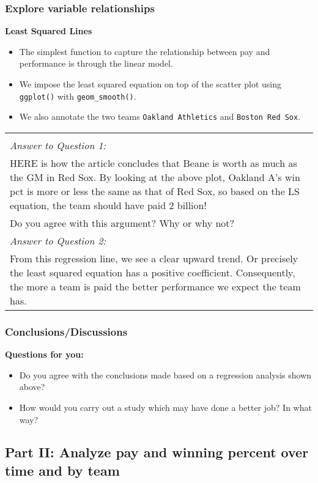 \documentclass[
]{article}
\providecommand{\tightlist}{%
  \setlength{\itemsep}{0pt}\setlength{\parskip}{0pt}}
\begin{document}
\frametitle{Explore variable relationships}

\textbf{Least Squared Lines}

\begin{itemize}
\tightlist
\item
  The simplest function to capture the relationship between pay and
  performance is through the linear model.\\
\item
  We impose the least squared equation on top of the scatter plot using
  \texttt{ggplot()} with \texttt{geom\_smooth()}.\\
\item
  We also annotate the two teams \texttt{Oakland\ Athletics} and
  \texttt{Boston\ Red\ Sox}.
\end{itemize}

\begin{longtable}[]{@{}
  >{\raggedright\arraybackslash}p{}@{}}
\toprule
\endhead
 \\
\emph{Answer to Question 1:} \\
HERE is how the article concludes that Beane is worth as much as the GM
in Red Sox. By looking at the above plot, Oakland A's win pct is more or
less the same as that of Red Sox, so based on the LS equation, the team
should have paid 2 billion! \\
Do you agree with this argument? Why or why not? \\
\emph{Answer to Question 2:} \\
From this regression line, we see a clear upward trend. Or precisely the
least squared equation has a positive coefficient. Consequently, the
more a team is paid the better performance we expect the team has. \\
\bottomrule
\end{longtable}

\frametitle{Conclusions/Discussions}

\textbf{Questions for you:}

\begin{itemize}
\tightlist
\item
  Do you agree with the conclusions made based on a regression analysis
  shown above?\\
\item
  How would you carry out a study which may have done a better job? In
  what way?
\end{itemize}

\hypertarget{part-ii-analyze-pay-and-winning-percent-over-time-and-by-team}{%
\subsection{Part II: Analyze pay and winning percent over time and by
team}\label{part-ii-analyze-pay-and-winning-percent-over-time-and-by-team}}
\end{document}

